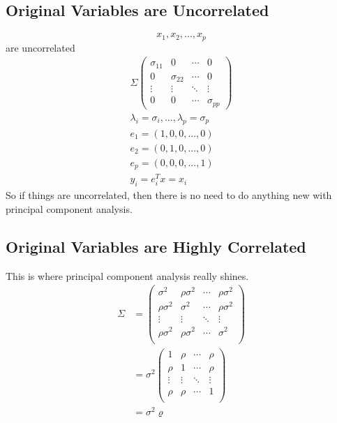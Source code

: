 \subsection{Original Variables are Uncorrelated}
\[x_1,x_2,...,x_p\] are uncorrelated
\begin{gather*}
\Sigma
\begin{pmatrix}
\sigma_{11} & 0 & \cdots & 0\\
 0& \sigma_{22} & \cdots & 0\\
 \vdots & \vdots & \ddots & \vdots \\
 0 & 0 & \cdots & \sigma_{pp}
\end{pmatrix}\\
\lambda_i = \sigma_i,...,\lambda_p = \sigma_p \\
e_1 = (1,0,0,...,0)\\
e_2 = (0,1,0,...,0)\\
e_p = (0,0,0,...,1)\\
y_i = e_i^Tx = x_i
\end{gather*}
So if things are uncorrelated, then there is no need to do anything new with principal component analysis.

\subsection{Original Variables are Highly Correlated}

This is where principal component analysis really shines.
\begin{align*}
    \Sigma &= \begin{pmatrix}
        \sigma^2 & \rho\sigma^2 & \cdots & \rho \sigma^2\\
        \rho\sigma^2 & \sigma^2 & \cdots & \rho \sigma^2\\
        \vdots & \vdots & \ddots & \vdots \\
        \rho\sigma^2 & \rho\sigma^2 & \cdots &  \sigma^2\\
    \end{pmatrix}\\
    &= \sigma^2 \begin{pmatrix}
        1 & \rho & \cdots & \rho \\
        \rho & 1 & \cdots & \rho \\
        \vdots & \vdots & \ddots & \vdots \\
        \rho & \rho & \cdots &  1\\
    \end{pmatrix}\\
    &= \sigma^2 \varrho
\end{align*}


